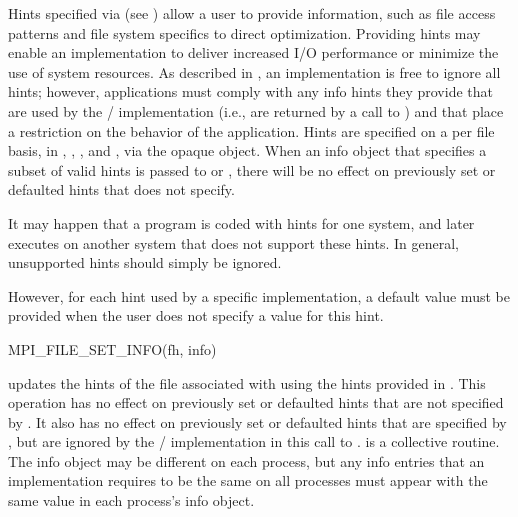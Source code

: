 Hints specified via 
(see )
allow a user to provide information,
such as
file access patterns and file system specifics
to direct optimization.
Providing hints may enable an implementation to deliver
increased I/O performance or minimize the use of system resources.
As described in ,
an implementation is free to ignore all hints; however, applications
must comply with any info hints they provide that are used by the \MPI/
implementation (i.e., are returned by a call to
) and that place a restriction on the
behavior of the application.
Hints are specified on a per file basis,
in , ,
, and ,
via the opaque  object.
When an info object that specifies a subset of valid hints is passed to
 or , 
there will be no effect on
previously set or defaulted hints that  does not specify. 

\begin{implementors}
It may happen that a program is coded with hints for one system, and
later executes on another system that does not support these hints.
In general, unsupported hints should simply be ignored.

However, for each hint used by a specific implementation,
a default value must be provided
when the user does not specify a value for this hint.
\end{implementors}

%
%
\begin{funcdef}{MPI\_FILE\_SET\_INFO}{(\mbox{fh}, \mbox{info})}
\end{funcdef}

 updates the hints of the file
associated with  using the hints provided in .
This operation has no effect on previously set or defaulted hints that
are not specified by .  It also has no effect on previously
set or defaulted hints that are specified by , but are
ignored by the \MPI/ implementation in this call to
.
 is a collective routine.
The info object
may be different on each process, but any info entries that an
implementation requires to be the same on all processes must
appear
with the same value
in each process's info object.


